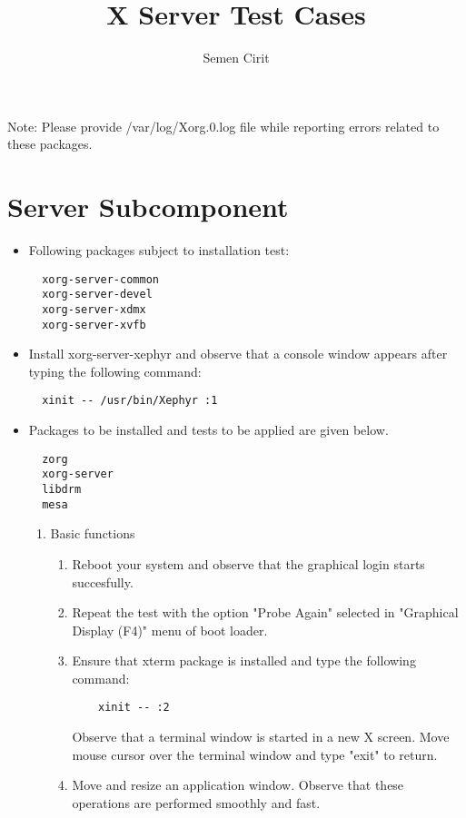 \documentclass[a4paper,10pt]{article}
\title{X Server Test Cases}
\author{Semen Cirit}
\begin{document}
\maketitle

Note: Please provide /var/log/Xorg.0.log file while reporting errors related to these packages.

\section{Server Subcomponent}

\begin{itemize}
  \item Following packages subject to installation test:
  \begin{verbatim}
  xorg-server-common
  xorg-server-devel
  xorg-server-xdmx
  xorg-server-xvfb
  \end{verbatim}

  \item Install xorg-server-xephyr and observe that a console window appears after typing
        the following command:
  \begin{verbatim}
  xinit -- /usr/bin/Xephyr :1
  \end{verbatim}

  \item Packages to be installed and tests to be applied are given below.
  \begin{verbatim}
  zorg    
  xorg-server
  libdrm
  mesa
  \end{verbatim}


  \begin{enumerate}
  \item Basic functions
    \begin{enumerate}
    \item Reboot your system and observe that the graphical login starts succesfully.
    \item Repeat the test with the option "Probe Again" selected in "Graphical Display (F4)" menu of boot loader.
    \item Ensure that xterm package is installed and type the following command:
      \begin{verbatim}
	xinit -- :2
      \end{verbatim}
      Observe that a terminal window is started in a new X screen. Move mouse cursor over the terminal window and type "exit" to return.
    \item Move and resize an application window. Observe that these operations are performed smoothly and fast.
    \end{enumerate}


\end{enumerate}
\end{itemize}
\end{document}
